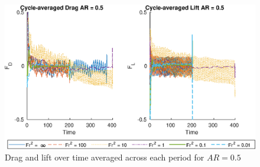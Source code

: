 \begin{figure}
    \centerline{\includegraphics[width=\textwidth]{images/spinning_ellipse/mvmean0p5.eps}}
    \caption{Drag and lift over time averaged across each period for $AR = 0.5$}
    \label{fig:mvmean0p5}
\end{figure}

